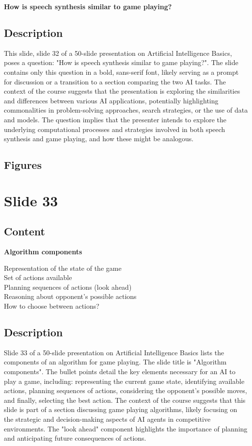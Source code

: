 \documentclass{article}%
\begin{document}
\textbf{How is speech synthesis similar to game playing?}
%
\subsection{Description}%
This slide, slide 32 of a 50-slide presentation on Artificial Intelligence Basics, poses a question: "How is speech synthesis similar to game playing?".  The slide contains only this question in a bold, sans-serif font, likely serving as a prompt for discussion or a transition to a section comparing the two AI tasks.  The context of the course suggests that the presentation is exploring the similarities and differences between various AI applications, potentially highlighting commonalities in problem-solving approaches, search strategies, or the use of data and models.  The question implies that the presenter intends to explore the underlying computational processes and strategies involved in both speech synthesis and game playing, and how these might be analogous.%
\subsection{Figures}%
\begin{figure}[H]%
\centering%
\end{figure}

%
\newpage%
\section{Slide 33}%
\label{sec:Slide33}%
\subsection{Content}%

\textbf{Algorithm components}

Representation of the state of the game \\
Set of actions available \\
Planning sequences of actions (look ahead) \\
Reasoning about opponent's possible actions \\
How to choose between actions?
%
\subsection{Description}%
Slide 33 of a 50-slide presentation on Artificial Intelligence Basics lists the components of an algorithm for game playing.  The slide title is "Algorithm components".  The bullet points detail the key elements necessary for an AI to play a game, including: representing the current game state, identifying available actions, planning sequences of actions, considering the opponent's possible moves, and finally, selecting the best action.  The context of the course suggests that this slide is part of a section discussing game playing algorithms, likely focusing on the strategic and decision-making aspects of AI agents in competitive environments.  The "look ahead" component highlights the importance of planning and anticipating future consequences of actions.%
\end{document}
